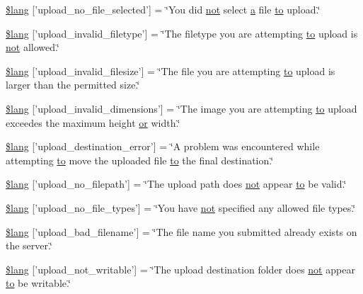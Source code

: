 \begin{DoxyCompactItemize}
\item 
\hyperlink{upload__lang_8php_a88d8e8f9b879d1c25e6c089f3d3b5a30}{\$lang} \mbox{[}'upload\-\_\-no\-\_\-file\-\_\-selected'\mbox{]} = \char`\"{}You did \hyperlink{mathquill_8js_ac1e1ab538c27d68cc2cbafea74e7412c}{not} select \hyperlink{bootstrap_8min_8js_a7318f59fb86a4437995ee89c780c51ac}{a} file \hyperlink{mathquill_8js_ae3622f38202b3532cd6eae25726945f8}{to} upload.\char`\"{}
\item 
\hyperlink{upload__lang_8php_ac8631aa85ed80396bd78e91a76d5fd38}{\$lang} \mbox{[}'upload\-\_\-invalid\-\_\-filetype'\mbox{]} = \char`\"{}The filetype you are attempting \hyperlink{mathquill_8js_ae3622f38202b3532cd6eae25726945f8}{to} upload is \hyperlink{mathquill_8js_ac1e1ab538c27d68cc2cbafea74e7412c}{not} allowed.\char`\"{}
\item 
\hyperlink{upload__lang_8php_a832b3ec1d84b1d48a488cf525954d8f2}{\$lang} \mbox{[}'upload\-\_\-invalid\-\_\-filesize'\mbox{]} = \char`\"{}The file you are attempting \hyperlink{mathquill_8js_ae3622f38202b3532cd6eae25726945f8}{to} upload is larger than the permitted size.\char`\"{}
\item 
\hyperlink{upload__lang_8php_a4e796eeccf7df90acffea7884a5bd558}{\$lang} \mbox{[}'upload\-\_\-invalid\-\_\-dimensions'\mbox{]} = \char`\"{}The image you are attempting \hyperlink{mathquill_8js_ae3622f38202b3532cd6eae25726945f8}{to} upload exceedes the maximum height \hyperlink{mathquill_8js_a6fdf1c439b25d95597e99492b728acaa}{or} width.\char`\"{}
\item 
\hyperlink{upload__lang_8php_a31be70c748b9bfc43dd7468e1fa64c42}{\$lang} \mbox{[}'upload\-\_\-destination\-\_\-error'\mbox{]} = \char`\"{}A problem was encountered while attempting \hyperlink{mathquill_8js_ae3622f38202b3532cd6eae25726945f8}{to} move the uploaded file \hyperlink{mathquill_8js_ae3622f38202b3532cd6eae25726945f8}{to} the final destination.\char`\"{}
\item 
\hyperlink{upload__lang_8php_a3c17908c53072c6a5ef593760aaaa704}{\$lang} \mbox{[}'upload\-\_\-no\-\_\-filepath'\mbox{]} = \char`\"{}The upload path does \hyperlink{mathquill_8js_ac1e1ab538c27d68cc2cbafea74e7412c}{not} appear \hyperlink{mathquill_8js_ae3622f38202b3532cd6eae25726945f8}{to} be valid.\char`\"{}
\item 
\hyperlink{upload__lang_8php_ab188c98e583c81905dedaad54ad452bb}{\$lang} \mbox{[}'upload\-\_\-no\-\_\-file\-\_\-types'\mbox{]} = \char`\"{}You have \hyperlink{mathquill_8js_ac1e1ab538c27d68cc2cbafea74e7412c}{not} specified any allowed file types.\char`\"{}
\item 
\hyperlink{upload__lang_8php_abb379322384f3f35952a539c63e2c8f7}{\$lang} \mbox{[}'upload\-\_\-bad\-\_\-filename'\mbox{]} = \char`\"{}The file name you submitted already exists on the server.\char`\"{}
\item 
\hyperlink{upload__lang_8php_aed6bfb5a9094179427f61fcbb582145b}{\$lang} \mbox{[}'upload\-\_\-not\-\_\-writable'\mbox{]} = \char`\"{}The upload destination folder does \hyperlink{mathquill_8js_ac1e1ab538c27d68cc2cbafea74e7412c}{not} appear \hyperlink{mathquill_8js_ae3622f38202b3532cd6eae25726945f8}{to} be writable.\char`\"{}
\end{DoxyCompactItemize}


